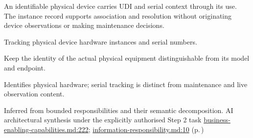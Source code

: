 An identifiable physical device carries UDI and serial context through its use. The instance record supports association and resolution without originating device observations or making maintenance decisions.



Tracking physical device hardware instances and serial numbers.



Keep the identity of the actual physical equipment distinguishable from its model and endpoint.



Identifies physical hardware; serial tracking is distinct from maintenance and live observation content.


Inferred from bounded responsibilities and their semantic decomposition. AI architectural synthesis under the explicitly authorised Step 2 task \hyperref[evidence:e01893359d483acf]{business-enabling-capabilities.md:222}; \hyperref[evidence:be61392fefb4bb10]{information-responsibility.md:10}
 (p.\,\pageref{cap:bec-device-definition})
